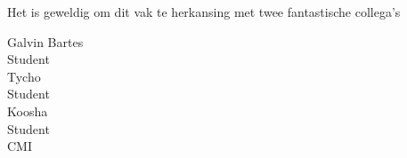 Het is geweldig om dit vak te herkansing met twee fantastische collega's

\vskip 1in

\noindent
Galvin Bartes\\
Student\\
 

\noindent
Tycho\\
Student\\

\noindent
Koosha\\
Student\\
CMI


